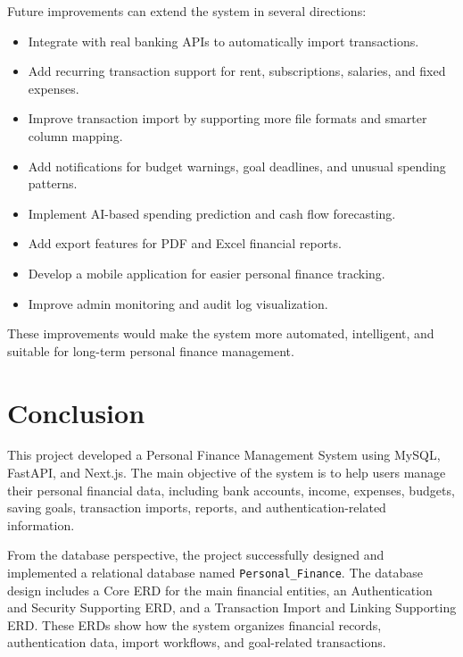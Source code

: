 \documentclass{article}
\begin{document}
Future improvements can extend the system in several directions:

\begin{itemize}
    \item Integrate with real banking APIs to automatically import transactions.
    \item Add recurring transaction support for rent, subscriptions, salaries, and fixed expenses.
    \item Improve transaction import by supporting more file formats and smarter column mapping.
    \item Add notifications for budget warnings, goal deadlines, and unusual spending patterns.
    \item Implement AI-based spending prediction and cash flow forecasting.
    \item Add export features for PDF and Excel financial reports.
    \item Develop a mobile application for easier personal finance tracking.
    \item Improve admin monitoring and audit log visualization.
\end{itemize}

These improvements would make the system more automated, intelligent, and suitable for long-term personal finance management.

\section{Conclusion}
\label{sec:conclusion}

This project developed a Personal Finance Management System using MySQL, FastAPI, and Next.js. The main objective of the system is to help users manage their personal financial data, including bank accounts, income, expenses, budgets, saving goals, transaction imports, reports, and authentication-related information.

From the database perspective, the project successfully designed and implemented a relational database named \texttt{Personal\_Finance}. The database design includes a Core ERD for the main financial entities, an Authentication and Security Supporting ERD, and a Transaction Import and Linking Supporting ERD. These ERDs show how the system organizes financial records, authentication data, import workflows, and goal-related transactions.
\end{document}
